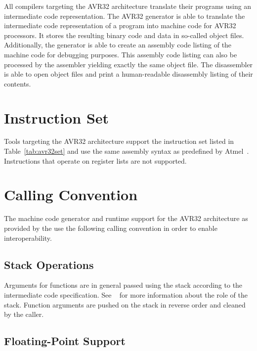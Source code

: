 All compilers targeting the AVR32 architecture translate their programs using an intermediate code representation.
The AVR32 generator is able to translate the intermediate code representation of a program into machine code for AVR32 processors.
It stores the resulting binary code and data in so-called object files.
Additionally, the generator is able to create an assembly code listing of the machine code for debugging purposes.
This assembly code listing can also be processed by the assembler yielding exactly the same object file.
The disassembler is able to open object files and print a human-readable disassembly listing of their contents.
\seeobject\seecode

\section{Instruction Set}

Tools targeting the AVR32 architecture support the instruction set listed in Table~\ref{tab:avr32set} and use the same assembly syntax as predefined by Atmel~\cite{avr32:instructionset}.
Instructions that operate on register lists are not supported.
\seeassembly


\section{Calling Convention}

The machine code generator and runtime support for the AVR32 architecture as provided by the \ecs{} use the following calling convention in order to enable interoperability.

\subsection{Stack Operations}

Arguments for functions are in general passed using the stack according to the intermediate code specification.
See \Documentation{}~ for more information about the role of the stack.
Function arguments are pushed on the stack in reverse order and cleaned by the caller.

\subsection{Floating-Point Support}

